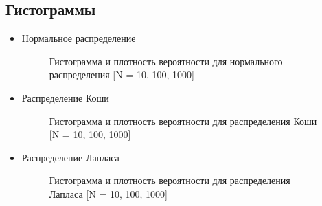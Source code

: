 \subsection{Гистограммы}
\label{subsec:result_hist}
\begin{itemize}
	\item{Нормальное распределение}
	\begin{figure}[H]
		\caption{Гистограмма и плотность вероятности для нормального распределения [N = 10, 100, 1000]}
		\label{fig:hist_normal}
	\end{figure}
	
	\item{Распределение Коши}
	\begin{figure}[H]
		\caption{Гистограмма и плотность вероятности для распределения Коши [N = 10, 100, 1000]}
		\label{fig:hist_cauchy}
	\end{figure}
		
	\item{Распределение Лапласа}
	\begin{figure}[H]
		\caption{Гистограмма и плотность вероятности для распределения Лапласа [N = 10, 100, 1000]}
		\label{fig:hist_laplace}
	\end{figure}
		

\end{itemize}
